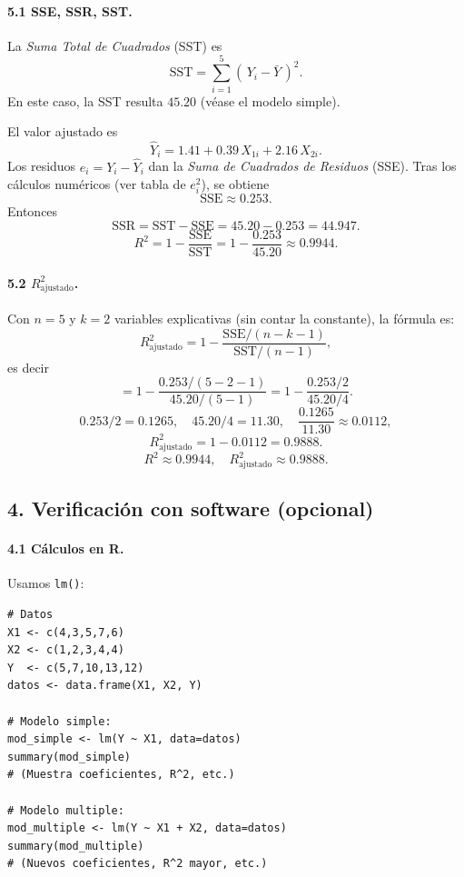 \documentclass[10pt,a4paper]{article}
\begin{document}
\begin{enumerate}
\paragraph{5.1 SSE, SSR, SST.}

La \emph{Suma Total de Cuadrados} (SST) es
\[
\text{SST}
= \sum_{i=1}^5 (\,Y_i - \bar{Y}\,)^2.
\]
En este caso, la SST resulta $45.20$ (véase el modelo simple).  

El valor ajustado es
\[
\hat{Y}_i
= 1.41 + 0.39\,X_{1i} + 2.16\,X_{2i}.
\]
Los residuos $e_i=Y_i-\hat{Y}_i$ dan la \emph{Suma de Cuadrados de Residuos} (SSE). Tras los cálculos numéricos (ver tabla de $e_i^2$), se obtiene
\[
\text{SSE} \approx 0.253.
\]
Entonces
\[
\text{SSR}
= \text{SST} - \text{SSE}
= 45.20 - 0.253
= 44.947.
\]
\[
R^2
= 1-\frac{\text{SSE}}{\text{SST}}
= 1 - \frac{0.253}{45.20}
\approx 0.9944.
\]

\paragraph{5.2 $R_{\text{ajustado}}^2$.}

Con $n=5$ y $k=2$ variables explicativas (sin contar la constante), la fórmula es:
\[
R_{\text{ajustado}}^2
= 1
- 
\frac{\text{SSE}/(n-k-1)}{\text{SST}/(n-1)},
\]
es decir
\[
= 1
- 
\frac{0.253/(5-2-1)}{45.20/(5-1)}
= 1
- 
\frac{0.253/2}{45.20/4}.
\]
\[
0.253/2 = 0.1265,
\quad
45.20/4=11.30,
\quad
\frac{0.1265}{11.30}\approx 0.0112,
\]
\[
R_{\text{ajustado}}^2
= 1-0.0112
= 0.9888.
\]
\[
\boxed{
R^2 \approx 0.9944,
\quad
R_{\text{ajustado}}^2 \approx 0.9888.
}
\]



\subsection*{4. Verificaci\'on con software (opcional)}

\paragraph{4.1 C\'alculos en R.} Usamos \texttt{lm()}:

\begin{lstlisting}
# Datos
X1 <- c(4,3,5,7,6)
X2 <- c(1,2,3,4,4)
Y  <- c(5,7,10,13,12)
datos <- data.frame(X1, X2, Y)

# Modelo simple:
mod_simple <- lm(Y ~ X1, data=datos)
summary(mod_simple)
# (Muestra coeficientes, R^2, etc.)

# Modelo multiple:
mod_multiple <- lm(Y ~ X1 + X2, data=datos)
summary(mod_multiple)
# (Nuevos coeficientes, R^2 mayor, etc.)
\end{lstlisting}



\end{enumerate}
\end{document}
